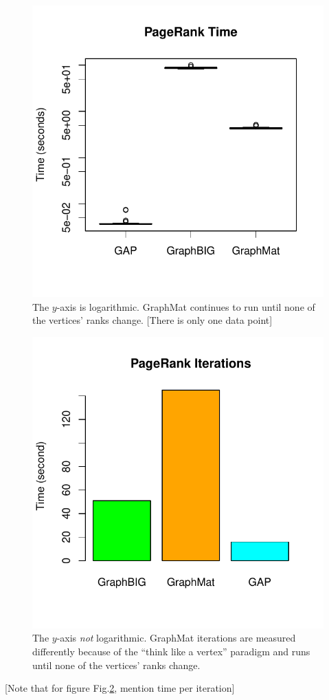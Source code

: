 \documentclass[conference]{IEEEtran}
\begin{document}
\begin{figure}
	\centering
	\includegraphics[width=0.8\columnwidth]{graphics/pr_time.pdf}
	\vspace{-18pt}
	\caption{The $y$-axis is logarithmic. GraphMat continues to run until none of the vertices' ranks change. [There is only one data point]}
	\label{fig:pr-time}
\end{figure}

\begin{figure}
	\centering
	\includegraphics[width=0.8\columnwidth]{graphics/pr_iters.pdf}
	\vspace{-18pt}
	\caption{The $y$-axis \emph{not} logarithmic. GraphMat iterations are measured differently because of the ``think like a vertex'' paradigm and runs until none of the vertices' ranks change.}
	\label{fig:pr-iters}
\end{figure}
[Note that for figure Fig.\ref{fig:pr-iters}, mention time per iteration]
\end{document}
